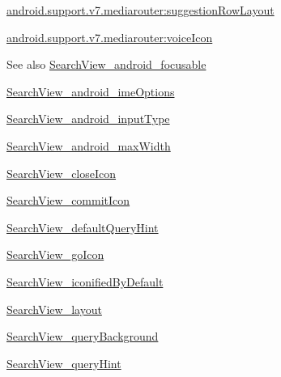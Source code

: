{\ttfamily \hyperlink{classandroid_1_1support_1_1v7_1_1mediarouter_1_1R_1_1styleable_aa17d257e1bac480445b5018c0512ade5}{android.\+support.\+v7.\+mediarouter\+:suggestion\+Row\+Layout}}

{\ttfamily \hyperlink{classandroid_1_1support_1_1v7_1_1mediarouter_1_1R_1_1styleable_a3d6a51de35b16974fa4a58f2beddf32d}{android.\+support.\+v7.\+mediarouter\+:voice\+Icon}}

\begin{DoxySeeAlso}{See also}
\hyperlink{classandroid_1_1support_1_1v7_1_1mediarouter_1_1R_1_1styleable_a409578cfacc43a6019fc4ba0da3b4ac7}{Search\+View\+\_\+android\+\_\+focusable} 

\hyperlink{classandroid_1_1support_1_1v7_1_1mediarouter_1_1R_1_1styleable_aac95101925665a6dff1249a18559dad5}{Search\+View\+\_\+android\+\_\+ime\+Options} 

\hyperlink{classandroid_1_1support_1_1v7_1_1mediarouter_1_1R_1_1styleable_a2ba4d91c907ae2c795917d5130b61808}{Search\+View\+\_\+android\+\_\+input\+Type} 

\hyperlink{classandroid_1_1support_1_1v7_1_1mediarouter_1_1R_1_1styleable_a937cf9b30ff311ddda2782bc237be919}{Search\+View\+\_\+android\+\_\+max\+Width} 

\hyperlink{classandroid_1_1support_1_1v7_1_1mediarouter_1_1R_1_1styleable_adc953a78777a6f78846028fcb3c7c1aa}{Search\+View\+\_\+close\+Icon} 

\hyperlink{classandroid_1_1support_1_1v7_1_1mediarouter_1_1R_1_1styleable_ae0021e7caae5581aab60a4f50e79af40}{Search\+View\+\_\+commit\+Icon} 

\hyperlink{classandroid_1_1support_1_1v7_1_1mediarouter_1_1R_1_1styleable_a4bee2315e2c3bab5b734df62936a8ad9}{Search\+View\+\_\+default\+Query\+Hint} 

\hyperlink{classandroid_1_1support_1_1v7_1_1mediarouter_1_1R_1_1styleable_a3caf53e79313da629e99a8bb5fe0a8f8}{Search\+View\+\_\+go\+Icon} 

\hyperlink{classandroid_1_1support_1_1v7_1_1mediarouter_1_1R_1_1styleable_a8d919271ebc1a35d5b4d097c8a4fef08}{Search\+View\+\_\+iconified\+By\+Default} 

\hyperlink{classandroid_1_1support_1_1v7_1_1mediarouter_1_1R_1_1styleable_a0261fec701a8d342dc4392b2612e4fdc}{Search\+View\+\_\+layout} 

\hyperlink{classandroid_1_1support_1_1v7_1_1mediarouter_1_1R_1_1styleable_a3ac6b81bd921b428110700ffe00dfa9f}{Search\+View\+\_\+query\+Background} 

\hyperlink{classandroid_1_1support_1_1v7_1_1mediarouter_1_1R_1_1styleable_a8a63f4bf8bd850c17ab2faf9d9eb2305}{Search\+View\+\_\+query\+Hint} 


\end{DoxySeeAlso}
